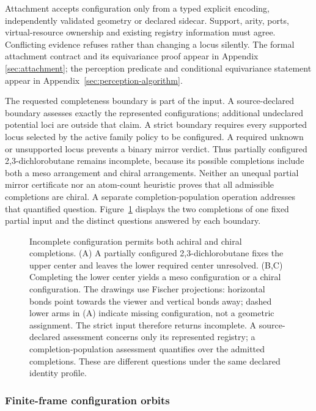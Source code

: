 \documentclass[pdflatex,sn-mathphys-num,referee,lineno]{sn-jnl}
\theoremstyle{plain}
\theoremstyle{remark}
\theoremstyle{definition}
\begin{document}
Attachment accepts configuration only from a typed explicit encoding,
independently validated geometry or declared sidecar. Support, arity, ports,
virtual-resource ownership and existing registry information must agree.
Conflicting evidence refuses rather than changing a locus silently. The formal
attachment contract and its equivariance proof appear in Appendix~
\ref{sec:attachment}; the perception predicate and conditional equivariance
statement appear in Appendix~\ref{sec:perception-algorithm}.

The requested completeness boundary is part of the input. A source-declared
boundary assesses exactly the represented configurations; additional undeclared
potential loci are outside that claim. A strict boundary requires every
supported locus selected by the active family policy to be configured. A
required unknown or unsupported locus prevents a binary mirror verdict. Thus
partially configured 2,3-dichlorobutane remains incomplete, because its possible
completions include both a meso arrangement and chiral arrangements. Neither an
unequal partial mirror certificate nor an atom-count heuristic proves that all
admissible completions are chiral. A separate completion-population operation
addresses that quantified question.
Figure~\ref{fig:incomplete-completions} displays the two completions of one
fixed partial input and the distinct questions answered by each boundary.

\begin{figure}[htbp]
  \centering
  \resizebox{\textwidth}{!}{}
  \caption{Incomplete configuration permits both achiral and chiral completions.
  (A) A partially configured 2,3-dichlorobutane fixes the upper center and
  leaves the lower required center unresolved. (B,C) Completing the lower
  center yields a meso configuration or a chiral configuration. The drawings
  use Fischer projections: horizontal bonds point towards the viewer and
  vertical bonds away; dashed lower arms in (A) indicate missing configuration,
  not a geometric assignment. The strict input therefore returns incomplete.
  A source-declared assessment concerns only its represented registry; a
  completion-population assessment quantifies over the admitted completions.
  These are different questions under the same declared identity profile.}
  \label{fig:incomplete-completions}
\end{figure}

\subsubsection{Finite-frame configuration orbits}
\label{sec:orbit-summary}
\end{document}
